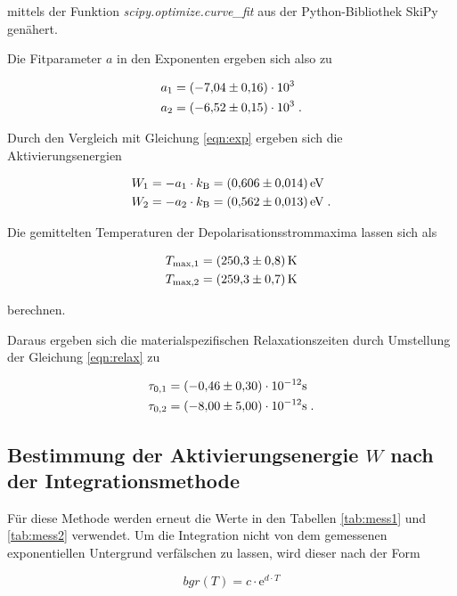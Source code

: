 mittels der Funktion \textit{scipy.optimize.curve\_fit} aus der Python-Bibliothek SkiPy genähert.

Die Fitparameter $a$ in den Exponenten ergeben sich also zu

\begin{align*}
  a_1 &= (\num{-7.04 +- 0.16})\cdot 10^3 \\
  a_2 &= (\num{-6.52 +- 0.15})\cdot 10^3  \; .
\end{align*}

Durch den Vergleich mit Gleichung \eqref{eqn:exp} ergeben sich die Aktivierungsenergien

\begin{align*}
  W_1 &= -a_1 \cdot k_\text{B} = \SI{0.606 +- 0.014}{\eV} \\
  W_2 &= -a_2 \cdot k_\text{B} = \SI{0.562 +- 0.013}{\eV}  \; .
\end{align*}

Die gemittelten Temperaturen der Depolarisationsstrommaxima lassen sich als

\begin{align*}
  T_\text{max,1} &= \SI{250.3 +- 0.8}{\kelvin} \\
  T_\text{max,2} &= \SI{259.3 +- 0.7}{\kelvin}
\end{align*}

berechnen.

Daraus ergeben sich die materialspezifischen Relaxationszeiten durch Umstellung der Gleichung \eqref{eqn:relax} zu

\begin{align*}
  \tau_{0,1} &= (\num{-0.46 +- 0.30}) \cdot 10^{-12} \si{\second}\\
  \tau_{0,2} &= (\num{-8.00 +- 5.00}) \cdot 10^{-12} \si{\second} \; .
\end{align*}

\subsection{Bestimmung der Aktivierungsenergie $W$ nach der Integrationsmethode}

Für diese Methode werden erneut die Werte in den Tabellen \ref{tab:mess1} und \ref{tab:mess2} verwendet.
Um die Integration nicht von dem gemessenen exponentiellen Untergrund verfälschen zu lassen, wird dieser 
nach der Form 

\begin{equation}
  bgr(T) = c \cdot \text{e}^{d \cdot T}
\end{equation}

